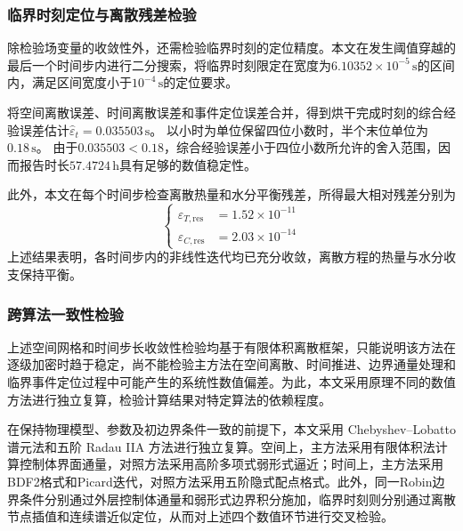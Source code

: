 \documentclass[withoutpreface,bwprint]{cumcmthesis}
\begin{document}
\subsubsection{临界时刻定位与离散残差检验}

除检验场变量的收敛性外，还需检验临界时刻的定位精度。本文在发生阈值穿越的最后一个时间步内进行二分搜索，将临界时刻限定在宽度为$6.10352\times10^{-5}\,\mathrm s$的区间内，满足区间宽度小于$10^{-4}\,\mathrm s$的定位要求。

将空间离散误差、时间离散误差和事件定位误差合并，得到烘干完成时刻的综合经验误差估计$\widehat\varepsilon_t=0.035503\,\mathrm s$。
以小时为单位保留四位小数时，半个末位单位为$0.18\,\mathrm s$。
由于$0.035503<0.18$，综合经验误差小于四位小数所允许的舍入范围，因而报告时长$57.4724\,\mathrm h$具有足够的数值稳定性。

此外，本文在每个时间步检查离散热量和水分平衡残差，所得最大相对残差分别为
\begin{equation}
\left\{
\begin{aligned}
\varepsilon_{T,\mathrm{res}}&=1.52\times10^{-11}\\
\varepsilon_{C,\mathrm{res}}&=2.03\times10^{-14}
\end{aligned}
\right.
\label{eq:q3-discrete-residuals}
\end{equation}
上述结果表明，各时间步内的非线性迭代均已充分收敛，离散方程的热量与水分收支保持平衡。

\subsubsection{跨算法一致性检验}

上述空间网格和时间步长收敛性检验均基于有限体积离散框架，只能说明该方法在逐级加密时趋于稳定，尚不能检验主方法在空间离散、时间推进、边界通量处理和临界事件定位过程中可能产生的系统性数值偏差。为此，本文采用原理不同的数值方法进行独立复算，检验计算结果对特定算法的依赖程度。

在保持物理模型、参数及初边界条件一致的前提下，本文采用 Chebyshev--Lobatto 谱元法和五阶 Radau IIA 方法进行独立复算。空间上，主方法采用有限体积法计算控制体界面通量，对照方法采用高阶多项式弱形式逼近；时间上，主方法采用BDF2格式和Picard迭代，对照方法采用五阶隐式配点格式。此外，同一Robin边界条件分别通过外层控制体通量和弱形式边界积分施加，临界时刻则分别通过离散节点插值和连续谱近似定位，从而对上述四个数值环节进行交叉检验。
\end{document}
